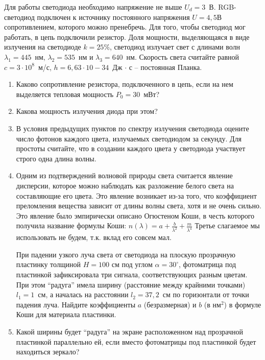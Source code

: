 
Для работы светодиода необходимо напряжение не выше $U_d = 3$~В. RGB-светодиод подключен к источнику постоянного 
напряжения $U = 4,5$В сопротивлением, которого можно пренебречь. Для того, чтобы светодиод мог работать, в цепь 
подключили резистор. Доля мощности, выделяющаяся в виде излучения на светодиоде $k = 25\%$, светодиод излучает 
свет с длинами волн $\lambda_1=445$~нм, $\lambda_2=535$~нм и $\lambda_3=640$~нм. Скорость света считайте равной 
$c=3 \cdot 10^8$~м/с, $h = 6,63 \cdot 10-{34}$~Дж $\cdot$ с – постоянная Планка.

\begin{enumerate}
    \item Каково сопротивление резистора, подключенного в цепь, если на нем выделяется тепловая мощность $P_0 = 30$~мВт?
    \item Какова мощность излучения диода при этом?
    \item В условия предыдущих пунктов по спектру излучения светодиода оцените число фотонов каждого цвета, излучаемых светодиодом за секунду. Для простоты считайте, что в создании каждого цвета у светодиода участвует строго одна длина волны.
    \item Одним из подтверждений волновой природы света считается явление дисперсии, которое можно наблюдать 
    как разложение белого света на составляющие его цвета. Это явление возникает из-за того, что коэффициент 
    преломления вещества зависит от длины волны света, хотя и не очень сильно. Это явление было эмпирически 
    описано Огюстеном Коши, в честь которого получила название формулы Коши: $n(\lambda)=a+\frac{b}{\lambda^2} + \frac{m}{\lambda^4}$  
    Третье слагаемое мы использовать не будем, т.к. вклад его совсем мал.
    
    При падении узкого луча света от светодиода на плоскую прозрачную пластинку толщиной $H = 100$ см под углом 
    $\alpha = 30^{\circ}$, фотоматрица под пластинкой зафиксировала три сигнала, соответствующих разным цветам. 
    При этом “радуга” имела ширину (расстояние между крайними точками) $l_1 = 1$~см, а началась на расстоянии 
    $l_2 = 37,2$~см по горизонтали от точки падения луча. Найдите коэффициенты $a$ (безразмерная) и $b$ (в нм$^2$) в 
    формуле Коши для материала пластинки.
    \item Какой ширины будет “радуга” на экране расположенном над прозрачной пластинкой параллельно ей, если вместо фотоматрицы под пластинкой будет находиться зеркало?
\end{enumerate}